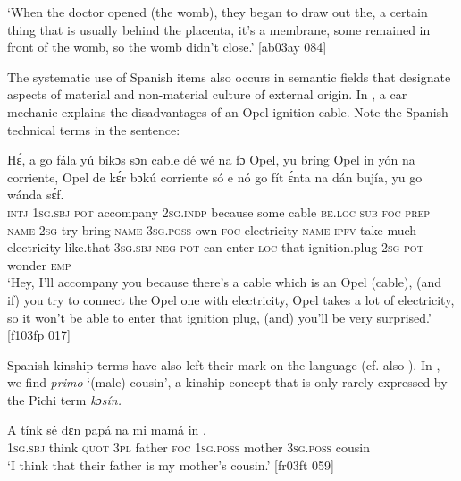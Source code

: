 \glt ‘When the doctor opened (the womb), they began to draw out the, a certain thing that 
is usually behind the placenta, it’s a membrane, some remained in front of the womb, 
so the womb didn’t close.’ [ab03ay 084]
\z

The systematic use of Spanish items also occurs in semantic fields that designate aspects of material and non-material culture of external origin. In , a car mechanic explains the disadvantages of an Opel ignition cable. Note the Spanish technical terms in the sentence: 


\ea%
    \label{ex:key:1762}
    \gll Hɛ́,  a    go  fála      yú    bikɔs  sɔn    cable  dé
wé  na  fɔ  Opel,  yu    bríng  Opel    in    yón   na
corriente,  Opel    de  kɛ́r    bɔkú  corriente    só    e
nó  go  fít  ɛ́nta    na  dán  bujía,    yu  go  wánda  sɛ́f.\\
\textsc{intj}  \textsc{1sg.sbj}  \textsc{pot}  accompany  \textsc{2sg.indp}  because  some  cable  \textsc{be.loc}
\textsc{sub}  \textsc{foc}  \textsc{prep}  \textsc{name}  \textsc{2sg}  try    bring  \textsc{name}  \textsc{3sg.poss}  own  \textsc{foc}
electricity  \textsc{name}  \textsc{ipfv}  take    much  electricity  like.that  \textsc{3sg.sbj}
\textsc{neg}  \textsc{pot}  can  enter  \textsc{loc}  that  ignition.plug  \textsc{2sg}  \textsc{pot}  wonder  \textsc{emp}\\

\glt ‘Hey, I’ll accompany you because there’s a cable which is an Opel (cable), (and if)
you try to connect the Opel one with electricity, Opel takes a lot of electricity, so
it won’t be able to enter that ignition plug, (and) you’ll be very surprised.’ [f103fp 017]
\z

Spanish kinship terms have also left their mark on the language (cf. also ). In , we find \textit{primo} ‘(male) cousin’, a kinship concept that is only rarely expressed by the Pichi term \textit{kɔsín.}


\ea%
    \label{ex:key:1763}
    \gll A    tínk    sé    dɛn  papá  na  mi    mamá  in    .\\
\textsc{1sg.sbj}  think  \textsc{quot}    \textsc{3pl}  father  \textsc{foc}  \textsc{1sg.poss}  mother  \textsc{3sg.poss}  cousin\\

\glt ‘I think that their father is my mother’s cousin.’ [fr03ft 059]
\z

